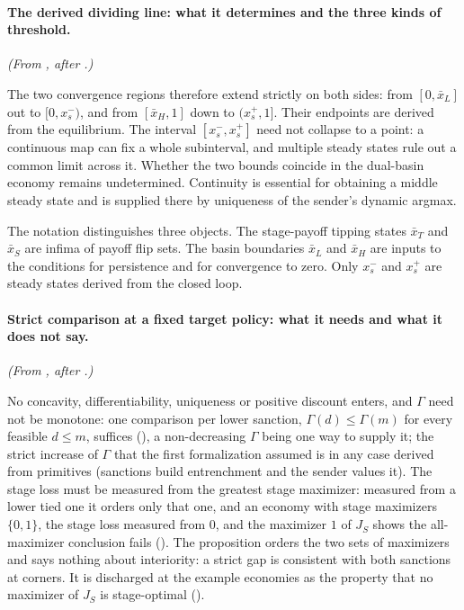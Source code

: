 \paragraph{The derived dividing line: what it determines and the three kinds of threshold.} \emph{(From , after .)}

The two convergence regions therefore extend strictly on both sides:
from $[0,\bar x_L]$ out to $[0,x_s^-)$, and from $[\bar x_H,1]$ down to
$(x_s^+,1]$. Their endpoints are derived from the equilibrium. The interval
$[x_s^-,x_s^+]$ need not collapse to a point: a continuous map can fix a whole
subinterval, and multiple steady states rule out a common limit across it. Whether
the two bounds coincide in the dual-basin economy remains
undetermined. Continuity is essential for obtaining a middle steady state and is
supplied there by uniqueness of the sender's dynamic argmax.

The notation distinguishes three objects. The stage-payoff tipping states
$\bar x_T$ and $\bar x_S$ are infima of payoff flip sets. The basin boundaries
$\bar x_L$ and $\bar x_H$ are inputs to the conditions for persistence and for convergence to zero.
Only $x_s^-$ and $x_s^+$ are steady states derived from the closed loop.

\paragraph{Strict comparison at a fixed target policy: what it needs and what it does not say.} \emph{(From , after .)}

No concavity, differentiability, uniqueness or positive discount enters, and
$\Gamma$ need not be monotone: one comparison per lower sanction, $\Gamma(d)\le\Gamma(m)$ for
every feasible $d\le m$, suffices
(), a
non-decreasing $\Gamma$ being one way to supply it; the strict increase of $\Gamma$ that
the first formalization assumed is in any case derived from primitives
(sanctions build entrenchment and the sender values it). The stage loss must be measured from the greatest
stage maximizer: measured from a lower tied one it orders only that one,
and an economy with stage maximizers $\{0,1\}$, the stage loss measured from $0$, and the
maximizer $1$ of $J_S$ shows the all-maximizer conclusion fails
(). The proposition orders the two sets of
maximizers and says nothing about interiority: a strict gap is consistent
with both sanctions at corners. It is discharged at the example
economies as the property that no maximizer of $J_S$ is
stage-optimal ().

